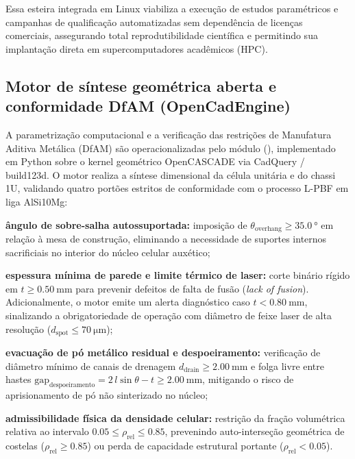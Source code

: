 Essa esteira integrada em Linux viabiliza a execução de estudos paramétricos e campanhas de qualificação automatizadas sem dependência de licenças comerciais, assegurando total reprodutibilidade científica e permitindo sua implantação direta em supercomputadores acadêmicos (HPC).

\subsection{Motor de síntese geométrica aberta e conformidade DfAM (OpenCadEngine)}
\label{subsec:opencad-dfam}

A parametrização computacional e a verificação das restrições de Manufatura Aditiva Metálica (DfAM) são operacionalizadas pelo módulo  (), implementado em Python sobre o kernel geométrico OpenCASCADE via CadQuery / build123d. O motor realiza a síntese dimensional da célula unitária e do chassi 1U, validando quatro portões estritos de conformidade com o processo L-PBF em liga AlSi10Mg:
\begin{alineas}
  \item \textbf{ângulo de sobre-salha autossuportada:} imposição de $\theta_{\text{overhang}} \ge \SI{35.0}{\degree}$ em relação à mesa de construção, eliminando a necessidade de suportes internos sacrificiais no interior do núcleo celular auxético;
  \item \textbf{espessura mínima de parede e limite térmico de laser:} corte binário rígido em $t \ge \SI{0.50}{\milli\metre}$ para prevenir defeitos de falta de fusão (\textit{lack of fusion}). Adicionalmente, o motor emite um alerta diagnóstico caso $t < \SI{0.80}{\milli\metre}$, sinalizando a obrigatoriedade de operação com diâmetro de feixe laser de alta resolução ($d_{\text{spot}} \le \SI{70}{\micro\metre}$);
  \item \textbf{evacuação de pó metálico residual e despoeiramento:} verificação de diâmetro mínimo de canais de drenagem $d_{\text{drain}} \ge \SI{2.00}{\milli\metre}$ e folga livre entre hastes $\text{gap}_{\text{despoeiramento}} = 2\,l\sin\theta - t \ge \SI{2.00}{\milli\metre}$, mitigando o risco de aprisionamento de pó não sinterizado no núcleo;
  \item \textbf{admissibilidade física da densidade celular:} restrição da fração volumétrica relativa ao intervalo $\num{0.05} \le \rho_{\text{rel}} \le \num{0.85}$, prevenindo auto-interseção geométrica de costelas ($\rho_{\text{rel}} \ge \num{0.85}$) ou perda de capacidade estrutural portante ($\rho_{\text{rel}} < \num{0.05}$).
\end{alineas}

